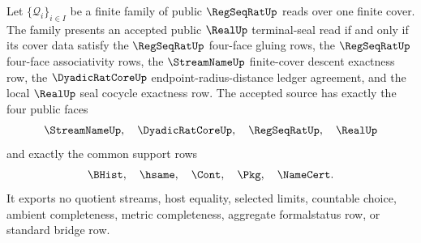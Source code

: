 \begin{theorem}
\label{thm:real-terminal-seal-regseqrat-cover-descent-equivalence}
Let $\{\mathcal Q_i\}_{i\in I}$ be a finite family of public
$\RegSeqRatUp$ reads over one finite cover. The family presents an accepted
public $\RealUp$ terminal-seal read if and only if its cover data satisfy the
$\RegSeqRatUp$ four-face gluing rows, the $\RegSeqRatUp$ four-face
associativity rows, the $\StreamNameUp$ finite-cover descent exactness row,
the $\DyadicRatCoreUp$ endpoint-radius-distance ledger agreement, and the
local $\RealUp$ seal cocycle exactness row. The accepted source has exactly
the four public faces
$$
\StreamNameUp,\quad \DyadicRatCoreUp,\quad \RegSeqRatUp,\quad \RealUp
$$
and exactly the common support rows
$$
\BHist,\quad \hsame,\quad \Cont,\quad \Pkg,\quad \NameCert.
$$
It exports no quotient streams, host equality, selected limits, countable
choice, ambient completeness, metric completeness, aggregate formalstatus row,
or standard bridge row.
\end{theorem}
